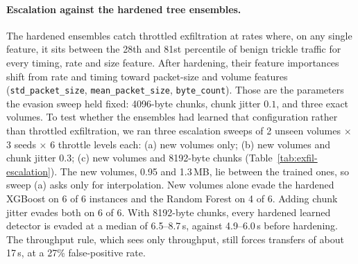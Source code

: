 \documentclass[preprint,12pt]{elsarticle}
\begin{document}
\paragraph{Escalation against the hardened tree ensembles.} The hardened ensembles catch throttled
exfiltration at rates where, on any single feature, it sits between the 28th and 81st percentile of
benign trickle traffic for every timing, rate and size feature. After hardening, their feature
importances shift from rate and timing toward packet-size and volume features
(\texttt{std\_packet\_size}, \texttt{mean\_packet\_size}, \texttt{byte\_count}). Those are the
parameters the evasion sweep held fixed: 4096-byte chunks, chunk jitter $0.1$, and three exact volumes.
To test whether the ensembles had learned that configuration rather than throttled exfiltration, we
ran three escalation sweeps of 2 unseen volumes $\times$ 3 seeds $\times$ 6 throttle levels each: (a)
new volumes only; (b) new volumes and chunk jitter $0.3$; (c) new volumes and 8192-byte chunks
(Table~\ref{tab:exfil-escalation}). The new volumes, 0.95 and 1.3\,MB, lie between the trained ones, so
sweep (a) asks only for interpolation. New volumes alone evade the hardened XGBoost on 6 of 6 instances
and the Random Forest on 4 of 6. Adding chunk jitter evades both on 6 of 6. With 8192-byte chunks, every
hardened learned detector is evaded at a median of 6.5--8.7\,s, against 4.9--6.0\,s before hardening.
The throughput rule, which sees only throughput, still forces transfers of about 17\,s, at a 27\%
false-positive rate.
\end{document}
